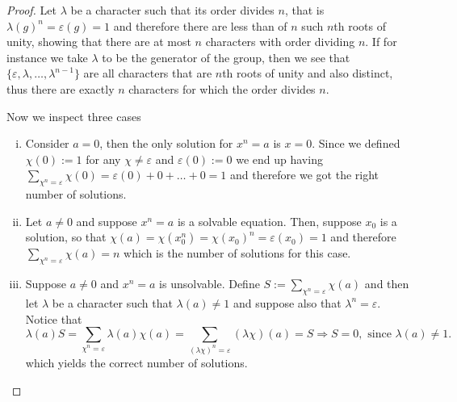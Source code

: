 \begin{proof}
   Let \(\lambda\) be a character such that its order divides \(n\), that is
   \(\lambda(g)^n = \varepsilon(g) = 1\) and therefore there are less than of
   \(n\) such \(n\)th roots of unity, showing that there are at most \(n\) 
   characters with order dividing \(n\). If for instance we take \(\lambda\) to
   be the generator of the group, then we see that \(\{\varepsilon, \lambda,
   \dots, \lambda^{n-1}\} \) are all characters that are \(n\)th roots of
   unity and also distinct, thus there are exactly \(n\) characters for which
   the order divides \(n\).

   Now we inspect three cases
   \begin{enumerate}[i.]
      \item Consider \(a = 0\), then the only solution for  \(x^n = a\) is  \(x
         =0\). Since we defined \(\chi(0) := 1\) for any \(\chi \neq
         \varepsilon\) and \(\varepsilon(0) := 0\) we end up having
         \(\sum_{\chi^n = \varepsilon} \chi(0) = \varepsilon(0) + 0 + \dots + 0
         = 1\) and therefore we got the right number of solutions.
      \item Let \(a \neq  0\) and suppose \(x^n = a\) is a solvable equation.
         Then, suppose \(x_0\) is a solution, so that \(\chi(a) = \chi(x_0^n) =
         \chi(x_0)^n = \varepsilon(x_0) = 1\) and therefore \(\sum_{\chi^n =
         \varepsilon}\chi(a) = n\) which is the number of solutions for this
         case.
      \item Suppose \(a \neq  0\) and \(x^n = a\) is unsolvable. Define \(S :=
         \sum_{\chi^n  = \varepsilon} \chi(a)\) and then let \(\lambda\) be a
         character such that  \(\lambda(a) \neq  1\) and suppose also that
         \(\lambda^n = \varepsilon\). Notice that 
         \[
            \lambda(a) S = \sum_{\chi^n = \varepsilon} \lambda(a)\chi(a) =
            \sum_{(\lambda \chi)^n = \varepsilon} (\lambda\chi)(a) =  S
            \Rightarrow S = 0, \text{ since } \lambda(a) \neq  1.
         \] 
         which yields the correct number of solutions.
   \end{enumerate}
\end{proof}



